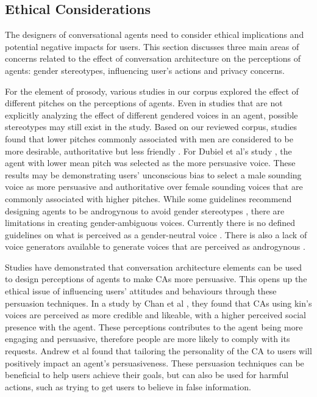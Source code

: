 \subsection{Ethical Considerations}

The designers of conversational agents need to consider ethical implications and potential negative impacts for users. This section discusses three main areas of concerns related to the effect of conversation architecture on the perceptions of agents: gender stereotypes, influencing user's actions and privacy concerns.

For the element of prosody, various studies in our corpus explored the effect of different pitches on the perceptions of agents. Even in studies that are not explicitly analyzing the effect of different gendered voices in an agent, possible stereotypes may still exist in the study. Based on our reviewed corpus, studies found that lower pitches commonly associated with men are considered to be more desirable, authoritative but less friendly \cite{tolmeijer2021female}\cmt{[62]}\cite{jestin2022effects}\cmt{[81]}. For Dubiel et al's study \cite{dubiel2020persuasive}\cmt{[60]}, the agent with lower mean pitch was selected as the more persuasive voice. These results may be demonstrating users' unconscious bias to select a male sounding voice as more persuasive and authoritative over female sounding voices that are commonly associated with higher pitches. While some guidelines recommend designing agents to be androgynous to avoid gender stereotypes \cite{ruane2019conversational}, there are limitations in creating gender-ambiguous voices. Currently there is no defined guidelines on what is perceived as a gender-neutral voice \cite{jestin2022effects}\cmt{[81]}. There is also a lack of voice generators available to generate voices that are perceived as androgynous \cite{tolmeijer2021female}\cmt{[62]}.

Studies have demonstrated that conversation architecture elements can be used to design perceptions of agents to make CAs more persuasive. This opens up the ethical issue of influencing users' attitudes and behaviours through these persuasion techniques. In a study by Chan et al \cite{chan2021kinvoices}\cmt{[74]}, they found that CAs using kin's voices are perceived as more credible and likeable, with a higher perceived social presence with the agent. These perceptions contributes to the agent being more engaging and persuasive, therefore people are more likely to comply with its requests. Andrew et al \cite{andrews2012system}\cmt{[38]} found that tailoring the personality of the CA to users will positively impact an agent's persuasiveness. These persuasion techniques can be beneficial to help users achieve their goals, but can also be used for harmful actions, such as trying to get users to believe in false information.

